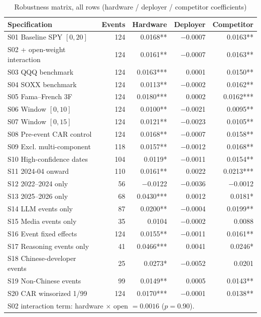 \documentclass[review,12pt,authoryear]{elsarticle}
\begin{document}
\begin{table}[htbp]
\centering
\caption{Robustness matrix, all rows (hardware / deployer / competitor coefficients)}
\label{tab:app_robust}
\footnotesize
\begin{tabular}{lrrrr}
\toprule
Specification & Events & Hardware & Deployer & Competitor \\
\midrule
S01 Baseline SPY $[0,20]$      & 124 & 0.0168** & $-$0.0007 & 0.0163** \\
S02 + open-weight interaction  & 124 & 0.0161** & $-$0.0007 & 0.0163** \\
S03 QQQ benchmark              & 124 & 0.0163*** & 0.0001 & 0.0150** \\
S04 SOXX benchmark             & 124 & 0.0113** & $-$0.0002 & 0.0162** \\
S05 Fama--French 3F            & 124 & 0.0180*** & 0.0002 & 0.0162*** \\
S06 Window $[0,10]$            & 124 & 0.0100** & $-$0.0021 & 0.0095** \\
S07 Window $[0,15]$            & 124 & 0.0121** & $-$0.0023 & 0.0105** \\
S08 Pre-event CAR control      & 124 & 0.0168** & $-$0.0007 & 0.0158** \\
S09 Excl. multi-component      & 118 & 0.0157** & $-$0.0012 & 0.0168** \\
S10 High-confidence dates      & 104 & 0.0119* & $-$0.0011 & 0.0154** \\
S11 2024-04 onward             & 110 & 0.0161** & 0.0022 & 0.0213*** \\
S12 2022--2024 only            & 56  & $-$0.0122 & $-$0.0036 & $-$0.0012 \\
S13 2025--2026 only            & 68  & 0.0430*** & 0.0012 & 0.0181* \\
S14 LLM events only            & 87  & 0.0200** & $-$0.0004 & 0.0199** \\
S15 Media events only          & 35  & 0.0104 & $-$0.0002 & 0.0088 \\
S16 Event fixed effects        & 124 & 0.0155** & $-$0.0011 & 0.0161** \\
S17 Reasoning events only      & 41  & 0.0466*** & 0.0041 & 0.0246* \\
S18 Chinese-developer events   & 25  & 0.0273* & $-$0.0052 & 0.0201 \\
S19 Non-Chinese events         & 99  & 0.0149** & 0.0005 & 0.0143** \\
S20 CAR winsorized 1/99        & 124 & 0.0170*** & $-$0.0001 & 0.0138** \\
\midrule
\multicolumn{5}{l}{S02 interaction term: hardware $\times$ open $=0.0016$ ($p=0.90$).} \\
\bottomrule
\end{tabular}
\end{table}
\end{document}
